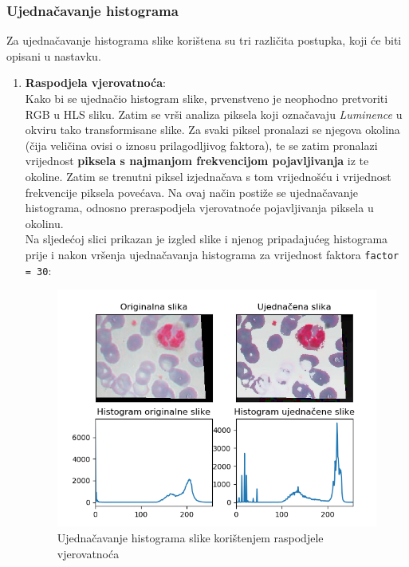 \documentclass[12pt,a4paper]{article}
\begin{document}
\newpage

\subsubsection{Ujednačavanje histograma}

Za ujednačavanje histograma slike korištena su tri različita postupka, koji će biti opisani u nastavku.

\begin{enumerate}

\item \textbf{Raspodjela vjerovatnoća}: \\

Kako bi se ujednačio histogram slike, prvenstveno je neophodno pretvoriti RGB u HLS sliku. Zatim se vrši analiza piksela koji označavaju \textit{Luminence} u okviru tako transformisane slike. Za svaki piksel pronalazi se njegova okolina (čija veličina ovisi o iznosu prilagodljivog faktora), te se zatim pronalazi vrijednost \textbf{piksela s najmanjom frekvencijom pojavljivanja} iz te okoline. Zatim se trenutni piksel izjednačava s tom vrijednošću i vrijednost frekvencije piksela povećava. Na ovaj način postiže se ujednačavanje histograma, odnosno preraspodjela vjerovatnoće pojavljivanja piksela u okolinu. \\

Na sljedećoj slici prikazan je izgled slike i njenog pripadajućeg histograma prije i nakon vršenja ujednačavanja histograma za vrijednost faktora \texttt{factor = 30}:

\begin{figure}[H]

\center
\includegraphics[scale=0.9]{s9Histogram1.png}
\caption{Ujednačavanje histograma slike korištenjem raspodjele vjerovatnoća}


\end{figure}
\end{enumerate}
\end{document}
